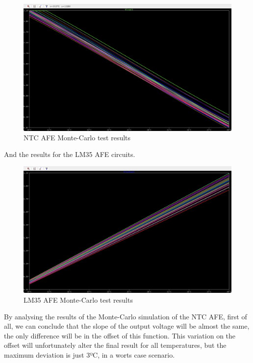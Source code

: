 \documentclass[12pt]{article}
\begin{document}
    \begin{figure}[H]
        \centering
        \includegraphics*[scale = 0.3]{images/montecarlo ntc.png}
        \caption{NTC AFE Monte-Carlo test results}
        \label{wrap-fig:1}
    \end{figure}

    And the results for the LM35 AFE circuits.

    \begin{figure}[H]
        \centering
        \includegraphics*[scale = 0.3]{images/montecarlo lm35.png}
        \caption{LM35 AFE Monte-Carlo test results}
        \label{wrap-fig:1}
    \end{figure}

    By analysing the results of the Monte-Carlo simulation of the NTC AFE, first of all, we can conclude that the
    slope of the output voltage will be almost the same, the only difference will be in the offset of this function.
    This variation on the offset will unfortunately alter the final result for all temperatures, but the maximum deviation is just 3ºC, in a worts case scenario.
\end{document}
